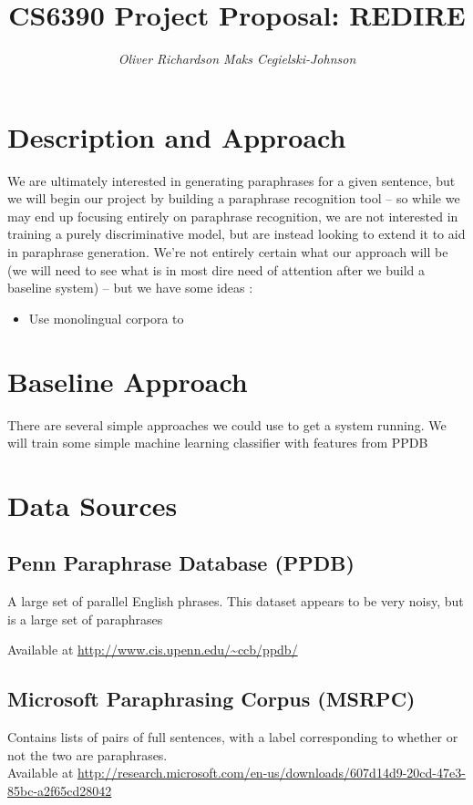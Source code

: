 \documentclass[11pt, reqno]{amsart}
\begin{document}
	\title{\LARGE CS6390 Project Proposal: REDIRE}
	\author{\it Oliver Richardson \hspace{2em} Maks Cegielski-Johnson }
	\maketitle 
	
	\vspace{-2em}
	
	\section{Description and Approach}
	We are ultimately interested in generating paraphrases for a given sentence, but we will begin our project by building a paraphrase recognition tool -- so while we may end up focusing entirely on paraphrase recognition, we are not interested in training a purely discriminative model, but are instead looking to extend it to aid in paraphrase generation.	We're not entirely certain what our approach will be (we will need to see what is in most dire need of attention after we build a baseline system)  -- but we have some ideas :
	
	\begin{itemize}
		\item Use monolingual corpora to 
	\end{itemize}
	
	\section{Baseline Approach}
	There are several simple approaches we could use to get a system running.
	We will train some simple machine learning classifier with features from PPDB 
	
	\section{Data Sources}
	\subsection{ Penn Paraphrase Database (PPDB)} 
	A large set of parallel English phrases. This dataset appears to be very noisy, but is a large set of paraphrases
	
	Available at \url{http://www.cis.upenn.edu/~ccb/ppdb/} 
		
	\subsection{Microsoft Paraphrasing Corpus (MSRPC) }
	Contains lists of pairs of full sentences, with a label corresponding to whether or not the two are paraphrases.\\
	Available at \url{http://research.microsoft.com/en-us/downloads/607d14d9-20cd-47e3-85bc-a2f65cd28042} 
	
\end{document}
